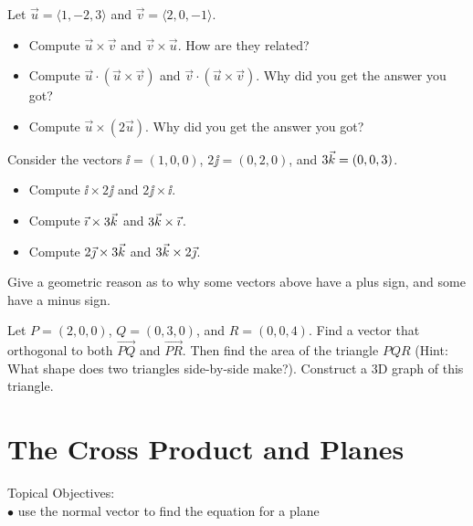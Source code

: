 \begin{problem}  
%
Let $\vec u=\langle 1,-2,3\rangle $ and $\vec v=\langle 2,0,-1\rangle$.  
\begin{itemize}
\item Compute $\vec u\times \vec v$ and $\vec v\times \vec u$.  How are they related?
\item Compute $\vec u \cdot (\vec u\times \vec v)$ and $\vec v \cdot (\vec u\times \vec v)$. Why did you get the answer you got?
\item Compute $\vec u \times (2\vec u)$.  Why did you get the answer you got?
\end{itemize}
\end{problem}

\begin{problem} 
%
Consider the vectors ${\ii}=(1,0,0)$, ${2\jj}=(0,2,0)$, and ${3\vec k}=(0,0,3)$.
\begin{itemize}
\item Compute $\ii\times {2\jj}$ and ${2\jj}\times {\ii}$.
\item Compute ${\vec \imath}\times {3\ensuremath{\vec k}}$ and ${3\vec k}\times {\ensuremath{\vec \imath}}$.
\item Compute ${2\vec \jmath}\times {3\ensuremath{\vec k}}$ and ${3\vec k}\times {2\ensuremath{\vec \jmath}}$.
\end{itemize}
Give a geometric reason as to why some vectors above have a plus sign, and some have a minus sign.
\end{problem}

\begin{problem}  
%
Let $P=(2,0,0)$, $Q=(0,3,0)$, and $R=(0,0,4)$. Find a vector that orthogonal to both $\vec {PQ}$ and $\vec {PR}$. Then find the area of the triangle $PQR$ (Hint: What shape does two triangles side-by-side make?). Construct a 3D graph of this triangle. 
\end{problem}

\section{The Cross Product and Planes}
\large Topical Objectives: \normalsize \\
\indent $\bullet$ use the normal vector to find the equation for a plane

